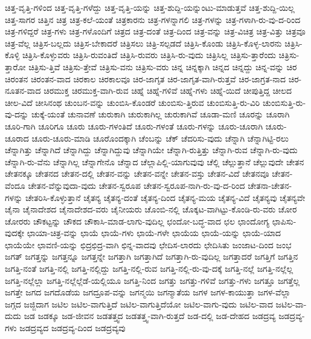 {ಚಿತ್ತ-ವೃತ್ತಿ-ಗಳಿಂದ
ಚಿತ್ತ-ವೃತ್ತಿ-ಗಳೆದ್ದು
ಚಿತ್ತ-ವೃತ್ತಿ-ಯನ್ನು
ಚಿತ್ತ-ಶುದ್ದಿ-ಯನ್ನುಂಟು-ಮಾಡುತ್ತವೆ
ಚಿತ್ತ-ಶುದ್ದಿ-ಯಿಲ್ಲ
ಚಿತ್ತ-ಸಾಗರ
ಚಿತ್ತಿನ
ಚಿತ್ರ
ಚಿತ್ರ-ಕಲೆ-ಯಂತೆ
ಚಿತ್ರಕಾರನು
ಚಿತ್ರ-ಗಳನ್ನಾಗಲಿ
ಚಿತ್ರ-ಗಳನ್ನು
ಚಿತ್ರ-ಗಳಾಗಿ-ರು-ವು-ದ-ರಿಂದ
ಚಿತ್ರ-ಗಳಿದ್ದರೆ
ಚಿತ್ರ-ಗಳು
ಚಿತ್ರ-ಗಳೊಂದಿಗೆ
ಚಿತ್ರದ
ಚಿತ್ರ-ದಂತೆ
ಚಿತ್ರ-ದಿಂದ
ಚಿತ್ರ-ವನ್ನು
ಚಿತ್ರ-ವಿಚಿತ್ರ
ಚಿತ್ರ-ವಿತ್ತು
ಚಿತ್ರವೂ
ಚಿತ್ರ-ವೆಲ್ಲ
ಚಿತ್ರಿಸ-ಬಲ್ಲದು
ಚಿತ್ರಿಸ-ಬೇಕಾದರೆ
ಚಿತ್ರಿಸಲು
ಚಿತ್ರಿ-ಸಲ್ಪಡದೆ
ಚಿತ್ರಿಸಿ-ಕೊಂಡು
ಚಿತ್ರಿಸಿ-ಕೊಳ್ಳ-ಲಾರನು
ಚಿತ್ರಿಸಿ-ಕೊಳ್ಳಿ
ಚಿತ್ರಿಸಿ-ಕೊಳ್ಳುವರು
ಚಿತ್ರಿಸಿ-ರುವಂತಿದೆ
ಚಿತ್ರಿಸಿ-ರುವರು
ಚಿತ್ರಿಸಿ-ರು-ವುದು
ಚಿತ್ರಿಸಿಲ್ಲ
ಚಿತ್ರಿಸು-ತ್ತಾರೆಂದು
ಚಿತ್ರಿಸು-ತ್ತಾರೋ
ಚಿತ್ರಿಸು-ತ್ತಿವೆ
ಚಿತ್ರಿಸು-ತ್ತೇವೆ
ಚಿತ್ರಿಸು-ವನು
ಚಿತ್ರಿಸು-ವರು
ಚಿನ್ನ
ಚಿನ್ನಕ್ಕಾಗಿ
ಚಿನ್ನದ
ಚಿನ್ನದ್ದು
ಚಿನ್ನ-ವನ್ನು
ಚಿರ
ಚಿರಂತನ
ಚಿರಂತನ-ವಾದ
ಚಿರಕಾಲ
ಚಿರಕಾಲವೂ
ಚಿರ-ಜಾಗೃತ
ಚಿರ-ಜಾಗೃತ-ವಾಗಿ-ರುತ್ತವೆ
ಚಿರ-ಜಾಗ್ರತ-ನಾದ
ಚಿರ-ನೂತನ-ವಾದ
ಚಿರಮುಕ್ತ
ಚಿರಮುಕ್ತ-ವಾಗಿ-ರುವ
ಚಿಹ್ನೆ
ಚಿಹ್ನೆ-ಗಳಿವೆ
ಚಿಹ್ನೆ-ಗಳು
ಚಿಹ್ನೆ-ಯಿದೆ
ಚೀಪುತ್ತಿದ್ದ
ಚೀಲದ
ಚೀಲ-ವಿದೆ
ಚೀಸಿನಂಥ
ಚುಂಬನ-ವನ್ನು
ಚುಂಬಿಸಿ-ಕೊಂಡರೆ
ಚುಂಬಿಸು-ತ್ತಿರುವ
ಚುಂಬಿಸುತ್ತಿ-ರು-ವಿರಿ
ಚುಂಬಿಸುತ್ತಿ-ರು-ವು-ದನ್ನು
ಚುಕ್ಕೆ-ಯಂತೆ
ಚುನಾವಣೆ
ಚುರುಕಾಗಿ
ಚುರುಕಾಗಿಲ್ಲ
ಚುರುಕಾಗಿವೆ
ಚೂಡಾ-ಮಣಿ
ಚೂರನ್ನು
ಚೂರಾಗಿ
ಚೂರಿ-ಗಾಗಿ
ಚೂರಿಗೂ
ಚೂರು
ಚೂರು-ಗಳಂತಿದೆ
ಚೂರು-ಗಳಂತೆ
ಚೂರು-ಗಳನ್ನು
ಚೂರು-ಚೂರಾಗಿ
ಚೂರು-ಚೂರಾದ
ಚೂರು-ಚೂರು-ಮಾಡಿ
ಚೂರೊಂದಕ್ಕಾಗಿ
ಚೆಂಬನ್ನು
ಚೆಕ್
ಚೆದರಿಸು-ವುದು
ಚೆನ್ನಾಗಿ
ಚೆನ್ನಾಗಿಟ್ಟಿ-ರಲು
ಚೆನ್ನಾಗಿತ್ತು
ಚೆನ್ನಾಗಿದೆ
ಚೆನ್ನಾಗಿದ್ದು
ಚೆನ್ನಾಗಿದ್ದುವು
ಚೆನ್ನಾಗಿಯೇ
ಚೆನ್ನಾಗಿ-ರುತ್ತಿತ್ತು
ಚೆನ್ನಾಗಿ-ರುವ
ಚೆನ್ನಾಗಿ-ರು-ವುದು
ಚೆನ್ನಾಗಿ-ರು-ವೆನು
ಚೆನ್ನಾಗಿಲ್ಲ
ಚೆನ್ನಾಗೇನೊ
ಚೆನ್ನಾದ
ಚೆಲ್ಲಾಪಿಲ್ಲಿ-ಯಾಗುವುವು
ಚೆಲ್ಲಿ
ಚೆಲ್ಲುತ್ತಾನೆ
ಚೆಲ್ಲುವುದೇ
ಚೇತನ
ಚೇತನಕ್ಕೂ
ಚೇತನದ
ಚೇತನ-ದಲ್ಲಿ
ಚೇತನ-ವನ್ನು
ಚೇತನ-ವನ್ನೇ
ಚೇತನ-ವಸ್ತು
ಚೇತನ-ವಿದೆ
ಚೇತನವೂ
ಚೇತನ-ವೆಂದೂ
ಚೇತನ-ವೆನ್ನುವುದಾ-ವುದು
ಚೇತನ-ಸ್ವರೂಪ
ಚೇತನ-ಸ್ವರೂಪ-ನಾಗಿ-ರು-ವು-ದ-ರಿಂದ
ಚೇತನಾ-ಚೇತನ-ಗಳನ್ನು
ಚೇತರಿಸಿ-ಕೊಳ್ಳುತ್ತಾನೆ
ಚೈತನ್ಯ
ಚೈತನ್ಯ-ದಂತೆ
ಚೈತನ್ಯ-ದಿಂದ
ಚೈತನ್ಯ-ಮಯ
ಚೈತನ್ಯ-ವಿದೆ
ಚೈತನ್ಯವು
ಚೈತನ್ಯವೇ
ಚೈನಾ
ಚೈನಾದೇಶದ
ಚೈನಾದೇಶದ-ವರು
ಚೈನೀಯರು
ಚೊಂಬಿ-ನಲ್ಲಿ
ಚೊಕ್ಕಟ-ವಾಗಿಟ್ಟು-ಕೊಂಡಿ-ರು-ವರು
ಚೋರ
ಚೋರರು
ಚೌಕಟ್ಟನ್ನು
ಚೌಕದ
ಚೌಕಾಸಿ-ಮಾಡ-ಲಾಗು-ವುದಿಲ್ಲ
ಛಂದೋ-ಬದ್ಧ-ವಾದ
ಛಲ
ಛಾಂದೋಗ್ಯ
ಛಾಪಿಸು-ವುದಕ್ಕೇ
ಛಾಯಾ-ಚಿತ್ರ-ವನ್ನು
ಛಾಯೆ
ಛಾಯೆ-ಗಳು
ಛಾಯೆ-ಗಳೇ
ಛಾಯೆಯ
ಛಾಯೆ-ಯನ್ನು
ಛಾಯೆ-ಯಾದ
ಛಾಯೆಯೇ
ಛಾವಣಿ-ಯನ್ನು
ಛಿದ್ರಛಿದ್ರ-ವಾಗಿ
ಛಿನ್ನ-ವಾದವು
ಛೇದಿಸ-ಲಾರದು
ಛೇದಿಸಿತು
ಜಂಜಾಟ-ದಿಂದ
ಜಂಭ
ಜಗತ್
ಜಗತ್ತನ್ನು
ಜಗತ್ತನ್ನೂ
ಜಗತ್ತನ್ನೇ
ಜಗತ್ತಾಗಿ
ಜಗತ್ತಾಗಿದೆ
ಜಗತ್ತಾಗಿ-ರು-ವುದಿಲ್ಲ
ಜಗತ್ತಾದರೆ
ಜಗತ್ತಿಗೆ
ಜಗತ್ತಿನ
ಜಗತ್ತಿ-ನಂತೆ
ಜಗತ್ತಿ-ನಲ್ಲಿ
ಜಗತ್ತಿ-ನಲ್ಲಿದ್ದು
ಜಗತ್ತಿ-ನಲ್ಲಿ-ರುವ
ಜಗತ್ತಿ-ನಲ್ಲಿ-ರು-ವು-ದಕ್ಕೆ
ಜಗತ್ತಿ-ನಲ್ಲೆ
ಜಗತ್ತಿ-ನಲ್ಲೆಲ್ಲ
ಜಗತ್ತಿ-ನಲ್ಲೆಲ್ಲಾ
ಜಗತ್ತಿ-ನಲ್ಲೆಲ್ಲೆಡೆ-ಯಲ್ಲಿಯೂ
ಜಗತ್ತಿ-ನಿಂದ
ಜಗತ್ತು
ಜಗತ್ತು-ಗಳಿವೆ
ಜಗತ್ತು-ಗಳು
ಜಗತ್ತೂ
ಜಗತ್ತೆಲ್ಲ
ಜಗತ್ತೇ
ಜಗದ
ಜಗದೊಡೆಯ
ಜಗದ್ರೂಪ-ವನ್ನು
ಜಗನ್ಮಯಿ
ಜಗನ್ಮಾತೆಯ
ಜಗಳ
ಜಗಳ-ಕಾಯುತ್ತಾ
ಜಗಳ-ವೆಲ್ಲಾ
ಜಗ್ಗದ
ಜಜ್ಜಿದಾಗ
ಜಟಿಲ
ಜಟಿಲ-ವಾಗುತ್ತಿದೆ
ಜಟಿಲ-ವಾಗುತ್ತಿದೆಯೋ
ಜಟಿಲ-ವಾಗು-ವುದು
ಜಟಿಲ-ವಾದ
ಜಟಿಲ-ವಾ-ದುದು
ಜಡ
ಜಡಕ್ಕೂ
ಜಡ-ಜೀವನ
ಜಡತತ್ತ್ವದ
ಜಡತತ್ತ್ವ-ವಾಗಿ-ರುತ್ತದೆ
ಜಡ-ದಲ್ಲಿ
ಜಡ-ದೇಹದ
ಜಡದ್ರವ್ಯ
ಜಡದ್ರವ್ಯ-ಗಳು
ಜಡದ್ರವ್ಯದ
ಜಡದ್ರವ್ಯ-ದಿಂದ
ಜಡದ್ರವ್ಯವು
}
